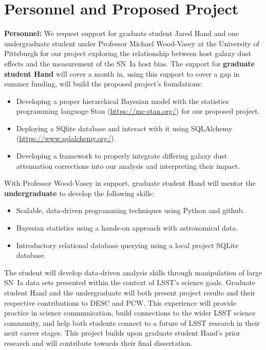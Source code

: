 \documentclass[modern]{aastex63}
\begin{document}
\section{Personnel and Proposed Project}
{\bf Personnel:}
We request support for graduate student Jared Hand and one undergraduate student under Professor Michael Wood-Vasey at the University of Pittsburgh for our project exploring the relationship between host galaxy dust effects and the measurement of the SN~Ia host bias.
The support for {\bf graduate student Hand} will cover a month in, using this support to cover a gap in summer funding, will build the proposed project's foundations:
\begin{itemize}
    \item Developing a proper hierarchical Bayesian model with the statistics programming language Stan ({\url{https://mc-stan.org/}}) for our proposed project.
    \item Deploying a SQlite database and interact with it using SQLAlchemy ({\url{https://www.sqlalchemy.org/}}).
    \item Developing a framework to properly integrate differing galaxy dust attenuation corrections into our analysis and interpreting their impact.
\end{itemize}
With Professor Wood-Vasey in support, graduate student Hand will mentor the {\bf undergraduate} to develop the following skills:
\begin{itemize}
    \item Scalable, data-driven programming techniques using Python and github.
    \item Bayesian statistics using a hands-on approach with astronomical data. 
    \item Introductory relational database querying using a local project SQLite database.
\end{itemize}
The student will develop data-driven analysis skills through manipulation of large SN~Ia data sets presented within the context of LSST's science goals.
Graduate student Hand and the undergraduate will both present project results and their respective contributions to DESC and PCW.
This experience will provide practice in science communication, build connections to the wider LSST science community, and help both students connect to a future of LSST research in their next career stages.
This project builds upon graduate student Hand's prior research \citep{Hand2021} and will contribute towards their final dissertation.
\end{document}
